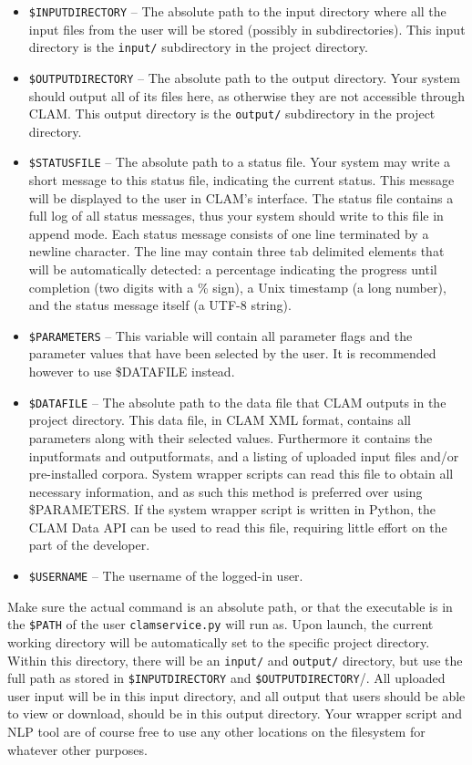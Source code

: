 \documentclass[a4paper,12pt]{report}
\begin{document}
\begin{itemize}
\item \texttt{\$INPUTDIRECTORY} -- The absolute path to the input directory where all the input files from the user will be stored (possibly in subdirectories). This input directory is the \texttt{input/} subdirectory in the project directory.
\item \texttt{\$OUTPUTDIRECTORY} -- The absolute path to the output directory. Your system should output all of its files here, as otherwise they are not accessible through CLAM.  This output directory is the \texttt{output/} subdirectory in the project directory.
\item \texttt{\$STATUSFILE} -- The absolute path to a status file. Your system may write a short message to this status file, indicating the current status. This message will be displayed to the user in CLAM's interface. The status file contains a full log of all status messages, thus your system should write to this file in append mode. Each status message consists of one line terminated by a newline character. The line may contain three tab delimited elements that will be automatically detected: a percentage indicating the progress until completion (two digits with a \% sign), a Unix timestamp (a long number), and the status message itself (a UTF-8 string).
\item \texttt{\$PARAMETERS} -- This variable will contain all parameter flags and the parameter values that have been selected by the user. It is recommended however to use \$DATAFILE instead.  
\item \texttt{\$DATAFILE} -- The absolute path to the data file that CLAM outputs in the project directory. This data file, in CLAM XML format, contains all parameters along with their selected values. Furthermore it contains the inputformats and outputformats, and a listing of uploaded input files and/or pre-installed corpora. System wrapper scripts can read this file to obtain all necessary information, and as such this method is preferred over using \$PARAMETERS. If the system wrapper script is written in Python, the CLAM Data API can be used to read this file, requiring little effort on the part of the developer. 
\item \texttt{\$USERNAME} -- The username of the logged-in user.
\end{itemize}


Make sure the actual command is an absolute path, or that the executable is in the \texttt{\$PATH} of the user \texttt{clamservice.py} will run as. Upon launch, the current working directory will be automatically set to the specific project directory. Within this directory, there will be an \texttt{input/} and \texttt{output/} directory, but use the full path as stored in \texttt{\$INPUTDIRECTORY} and \texttt{\$OUTPUTDIRECTORY}/. All uploaded user input will be in this input directory, and all output that users should be able to view or download, should be in this output directory. Your wrapper script and NLP tool are of course free to use any other locations on the filesystem for whatever other purposes.
\end{document}
